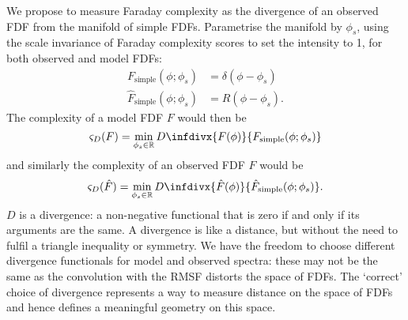         We propose to measure Faraday complexity as the divergence of an observed FDF from the manifold of simple FDFs. Parametrise the manifold by $\phi_s$, using the scale invariance of Faraday complexity scores to set the intensity to 1, for both observed and model FDFs:
        \begin{align}
            F_{\mathrm{simple}}(\phi; \phi_s) &= \delta(\phi - \phi_s)\\
            \hat F_{\mathrm{simple}}(\phi; \phi_s) &= R(\phi - \phi_s).
        \end{align}
        The complexity of a model FDF $F$ would then be
        \begin{equation}
            \label{eq:complexity-model}
            \varsigma_D(F) = \min_{\phi_s \in \mathbb{R}} D\infdivx{F(\phi)}{F_{\mathrm{simple}}(\phi; \phi_s)}
        \end{equation}
        and similarly the complexity of an observed FDF $\hat F$ would be
        \begin{equation}
            \label{eq:complexity-observed}
            \varsigma_D(\hat F) = \min_{\phi_s \in \mathbb{R}} D\infdivx{\hat F(\phi)}{\hat F_{\mathrm{simple}}(\phi; \phi_s)}.
        \end{equation}
        $D$ is a divergence: a non-negative functional that is zero if and only if its arguments are the same. A divergence is like a distance, but without the need to fulfil a triangle inequality or symmetry. We have the freedom to choose different divergence functionals for model and observed spectra: these may not be the same as the convolution with the RMSF distorts the space of FDFs. The `correct' choice of divergence represents a way to measure distance on the space of FDFs and hence defines a meaningful geometry on this space.

